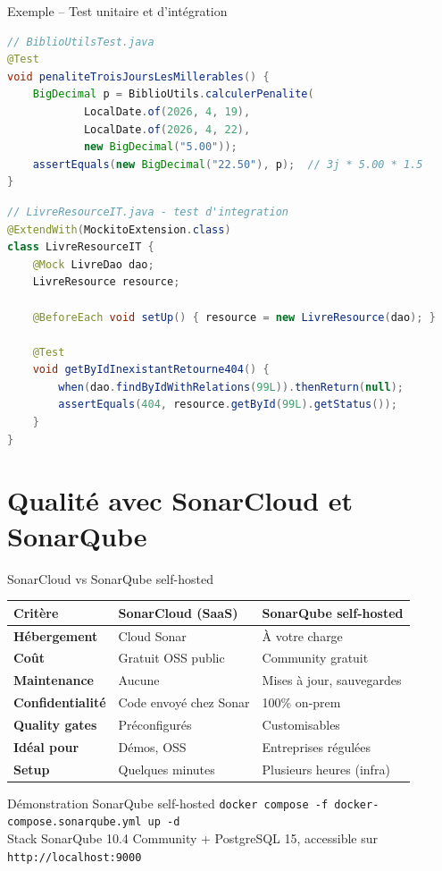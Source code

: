 \documentclass[aspectratio=169,12pt]{beamer}
\begin{document}
\begin{frame}[fragile]{Exemple -- Test unitaire et d'intégration}
  \begin{lstlisting}[language=Java]
// BiblioUtilsTest.java
@Test
void penaliteTroisJoursLesMillerables() {
    BigDecimal p = BiblioUtils.calculerPenalite(
            LocalDate.of(2026, 4, 19),
            LocalDate.of(2026, 4, 22),
            new BigDecimal("5.00"));
    assertEquals(new BigDecimal("22.50"), p);  // 3j * 5.00 * 1.5
}
  \end{lstlisting}

  \begin{lstlisting}[language=Java]
// LivreResourceIT.java - test d'integration
@ExtendWith(MockitoExtension.class)
class LivreResourceIT {
    @Mock LivreDao dao;
    LivreResource resource;

    @BeforeEach void setUp() { resource = new LivreResource(dao); }

    @Test
    void getByIdInexistantRetourne404() {
        when(dao.findByIdWithRelations(99L)).thenReturn(null);
        assertEquals(404, resource.getById(99L).getStatus());
    }
}
  \end{lstlisting}
\end{frame}

\section{Qualité avec SonarCloud et SonarQube}

\begin{frame}{SonarCloud vs SonarQube self-hosted}
  \centering
  \footnotesize
  \renewcommand{\arraystretch}{1.4}
  \begin{tabular}{>{\bfseries}p{2.8cm} p{4.5cm} p{4.5cm}}
    \toprule
    Critère & SonarCloud (SaaS) & SonarQube self-hosted \\
    \midrule
    Hébergement      & Cloud Sonar     & À votre charge \\
    Coût             & Gratuit OSS public & Community gratuit \\
    Maintenance      & Aucune          & Mises à jour, sauvegardes \\
    Confidentialité  & Code envoyé chez Sonar & 100\% on-prem \\
    Quality gates    & Préconfigurés   & Customisables \\
    Idéal pour       & Démos, OSS      & Entreprises régulées \\
    Setup            & Quelques minutes & Plusieurs heures (infra) \\
    \bottomrule
  \end{tabular}

  \vspace{0.6em}
  \begin{block}{Démonstration SonarQube self-hosted}
    \texttt{docker compose -f docker-compose.sonarqube.yml up -d}\\[0.2em]
    Stack SonarQube 10.4 Community + PostgreSQL 15, accessible sur
    \texttt{http://localhost:9000}
  \end{block}
\end{frame}
\end{document}
